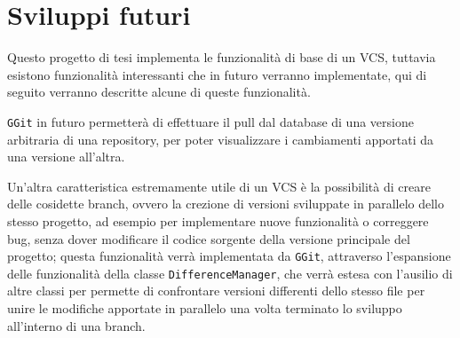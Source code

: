 \chapter*{Sviluppi futuri}

Questo progetto di tesi implementa le funzionalità di base di un VCS, tuttavia esistono funzionalità interessanti che in futuro verranno implementate, qui di seguito verranno descritte alcune di queste funzionalità.

\texttt{GGit} in futuro permetterà di effettuare il pull dal database di una versione arbitraria di una repository, per poter visualizzare i cambiamenti apportati da una versione all'altra.

Un'altra caratteristica estremamente utile di un VCS è la possibilità di creare delle cosidette branch, ovvero la crezione di versioni sviluppate in parallelo dello stesso progetto, ad esempio per implementare nuove funzionalità o correggere bug, senza dover modificare il codice sorgente della versione principale del progetto; questa funzionalità verrà implementata da \texttt{GGit}, attraverso l'espansione delle funzionalità della classe \texttt{DifferenceManager}, che verrà estesa con l'ausilio di altre classi per permette di confrontare versioni differenti dello stesso file per unire le modifiche apportate in parallelo una volta terminato lo sviluppo all'interno di una branch.